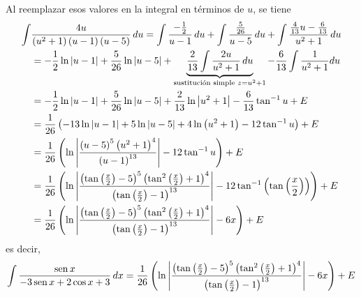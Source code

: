 Al reemplazar esos valores en la integral en términos de $u$, se tiene
\begin{gather*}
  \begin{aligned}
    \int &\frac{4u}{\left( u^{2}+1\right) \left( u-1\right) \left( u-5\right) }\, du=\int \frac{-\frac{1}{2}}{u-1}\, du+\int \frac{\frac{5}{26}}{u-5}\, du+\int \frac{%
    \frac{4}{13}u-\frac{6}{13}}{u^{2}+1}\, du \\
    &=-\frac{1}{2}\ln \left\vert u-1\right\vert +\frac{5}{26}\ln \left\vert
    u-5\right\vert +\underbrace{\frac{2}{13}\int \frac{2u}{u^{2}+1}\, du}_{\text{sustitución simple } z=u^2+1} -\frac{6}{13}\int \frac{1}{u^{2}+1}du \\
    &=-\frac{1}{2}\ln \left\vert u-1\right\vert +\frac{5}{26}\ln \left\vert
    u-5\right\vert +\frac{2}{13}\ln \left\vert u^{2}+1\right\vert -\frac{6}{13}\tan^{-1} u+E\\
    &=\frac{1}{26}\left( -13\ln \left\vert u-1\right\vert +5\ln \left\vert
    u-5\right\vert +4\ln \left( u^{2}+1\right) -12\tan^{-1} u\right)+E\\
    &=\frac{1}{26}\left( \ln \left\vert \frac{\left( u-5\right) ^{5}\left(
    u^{2}+1\right) ^{4}}{\left( u-1\right) ^{13}}\right\vert -12\tan^{-1} u\right)+E\\
    &=\frac{1}{26}\left( \ln \left\vert \frac{\left( \tan \left( \frac{x}{2}%
        \right) -5\right) ^{5}\left( \tan ^{2}\left( \frac{x}{2}\right) +1\right)
      ^{4}}{\left( \tan \left( \frac{x}{2}\right) -1\right) ^{13}}\right\vert
    -12\tan^{-1} \left( \tan \left( \frac{x}{2}\right) \right) \right)+E\\
    &=\frac{1}{26}\left( \ln \left\vert \frac{\left( \tan \left( \frac{x}{2}%
        \right) -5\right) ^{5}\left( \tan ^{2}\left( \frac{x}{2}\right) +1\right)
      ^{4}}{\left( \tan \left( \frac{x}{2}\right) -1\right) ^{13}}\right\vert
    -6x\right) +E
  \end{aligned}
\end{gather*}
es decir,
\begin{gather*}
  \int \frac{\operatorname{sen} x}{-3\operatorname{sen} x+2\cos x+3}\, dx =\frac{1}{26}\left( \ln \left\vert \frac{\left( \tan \left( \frac{x}{2}\right) -5\right) ^{5}\left( \tan ^{2}\left( \frac{x}{2}\right) +1\right)^{4}}{\left( \tan \left( \frac{x}{2}\right) -1\right) ^{13}}\right\vert-6x\right) +E
\end{gather*}

\enlargethispage*{\baselineskip}


